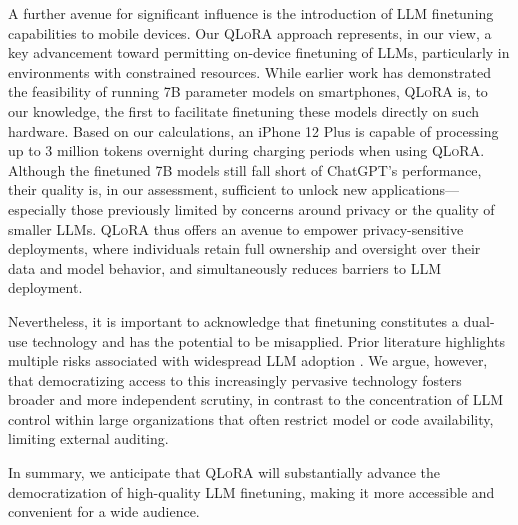 A further avenue for significant influence is the introduction of LLM finetuning capabilities to mobile devices. Our \textsc{QLoRA} approach represents, in our view, a key advancement toward permitting on-device finetuning of LLMs, particularly in environments with constrained resources. While earlier work has demonstrated the feasibility of running 7B parameter models on smartphones, \textsc{QLoRA} is, to our knowledge, the first to facilitate finetuning these models directly on such hardware. Based on our calculations, an iPhone 12 Plus is capable of processing up to 3 million tokens overnight during charging periods when using \textsc{QLoRA}. Although the finetuned 7B models still fall short of ChatGPT’s performance, their quality is, in our assessment, sufficient to unlock new applications—especially those previously limited by concerns around privacy or the quality of smaller LLMs. \textsc{QLoRA} thus offers an avenue to empower privacy-sensitive deployments, where individuals retain full ownership and oversight over their data and model behavior, and simultaneously reduces barriers to LLM deployment.

Nevertheless, it is important to acknowledge that finetuning constitutes a dual-use technology and has the potential to be misapplied. Prior literature highlights multiple risks associated with widespread LLM adoption \citep{bommasani2021opportunities,bender2021dangers}. We argue, however, that democratizing access to this increasingly pervasive technology fosters broader and more independent scrutiny, in contrast to the concentration of LLM control within large organizations that often restrict model or code availability, limiting external auditing.

In summary, we anticipate that \textsc{QLoRA} will substantially advance the democratization of high-quality LLM finetuning, making it more accessible and convenient for a wide audience.